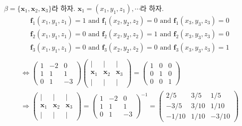 \documentclass{oblivoir}
\begin{document}
\begin{enumerate}
    $\beta = \{\mathbf{x}_1, \mathbf{x}_2, \mathbf{x}_3\}$라 하자. $\mathbf{x}_1 = (x_1, y_1, z_1), \cdots$라 하자. 
    \begin{align}
        \textbf{f}_1(x_1, y_1, z_1) = 1 \text{ and } \textbf{f}_1(x_2, y_2, z_2) = 0 \text{ and } \textbf{f}_1(x_3, y_3, z_3) = 0 \\
        \textbf{f}_2(x_1, y_1, z_1) = 0 \text{ and } \textbf{f}_2(x_2, y_2, z_2) = 1 \text{ and } \textbf{f}_2(x_3, y_3, z_3) = 0 \\
        \textbf{f}_3(x_1, y_1, z_1) = 0 \text{ and } \textbf{f}_3(x_2, y_2, z_2) = 0 \text{ and } \textbf{f}_3(x_3, y_3, z_3) = 1 \\
    \end{align}
    \begin{align}
        \Longleftrightarrow
        \begin{pmatrix}
            1 & -2 & 0\\
            1 & 1 & 1\\
            0 & 1 & -3
        \end{pmatrix}
        \begin{pmatrix}
            \mid & \mid & \mid\\
            \mathbf{x}_1 & \mathbf{x}_2 & \mathbf{x}_3\\
            \mid & \mid & \mid
        \end{pmatrix}
        =
        \begin{pmatrix}
            1 & 0 & 0\\
            0 & 1 & 0\\
            0 & 0 & 1
        \end{pmatrix}\\
        \Longrightarrow
        \begin{pmatrix}
            \mid & \mid & \mid\\
            \mathbf{x}_1 & \mathbf{x}_2 & \mathbf{x}_3\\
            \mid & \mid & \mid
        \end{pmatrix}
        =
        \begin{pmatrix}
            1 & -2 & 0\\
            1 & 1 & 1\\
            0 & 1 & -3
        \end{pmatrix}^{-1}
        =
        \begin{pmatrix}
            2/5 & 3/5 & 1/5\\
            -3/5 & 3/10 & 1/10\\
            -1/10 & 1/10 & -3/10
        \end{pmatrix}
    \end{align}
    

\end{enumerate}
\end{document}
